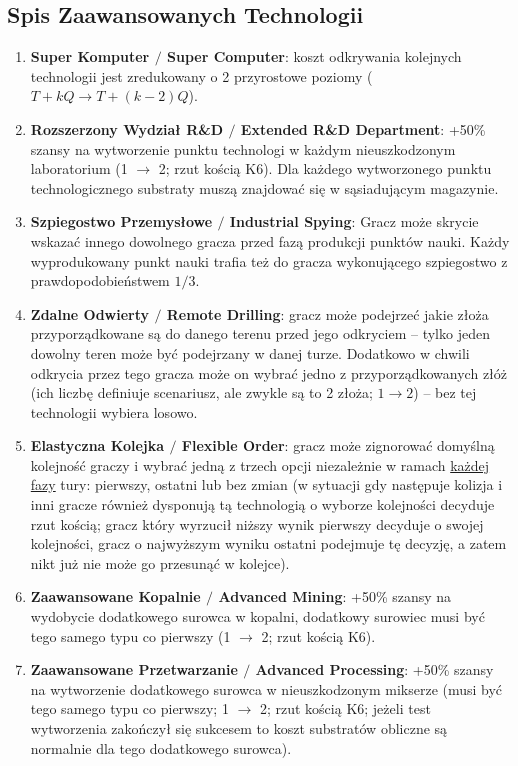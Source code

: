 \documentclass[11pt,a4paper]{article}
\begin{document}
\subsection{Spis Zaawansowanych Technologii}
\begin{enumerate}
\item \textbf{Super Komputer $/$ Super Computer}: koszt odkrywania kolejnych technologii jest zredukowany o 2 przyrostowe poziomy  ($T+kQ \to T+(k-2)Q$).
\item \textbf{Rozszerzony Wydział R\&D $/$ Extended R\&D Department}: +50\% szansy na wytworzenie punktu technologi w każdym nieuszkodzonym laboratorium (1 $\to$ 2; rzut kością K6). Dla każdego wytworzonego punktu technologicznego substraty muszą znajdować się w sąsiadującym magazynie.
\item \textbf{Szpiegostwo Przemysłowe $/$ Industrial Spying}: Gracz może skrycie wskazać innego dowolnego gracza przed fazą produkcji punktów nauki. Każdy wyprodukowany punkt nauki trafia też do gracza wykonującego szpiegostwo z prawdopodobieństwem $1/3$.
\item \textbf{Zdalne Odwierty $/$ Remote Drilling}: gracz może podejrzeć jakie złoża przyporządkowane są do danego terenu przed jego odkryciem -- tylko jeden dowolny teren może być podejrzany w danej turze. Dodatkowo w chwili odkrycia przez tego gracza może on wybrać jedno z przyporządkowanych złóż (ich liczbę definiuje scenariusz, ale zwykle są to 2 złoża; $1 \to 2$) -- bez tej technologii wybiera losowo.
\item \textbf{Elastyczna Kolejka $/$ Flexible Order}: gracz może zignorować domyślną kolejność graczy i wybrać jedną z trzech opcji niezależnie w ramach \underline{każdej fazy} tury: pierwszy, ostatni lub bez zmian (w sytuacji gdy następuje kolizja i inni gracze również dysponują tą technologią o wyborze kolejności decyduje rzut kością; gracz który wyrzucił niższy wynik pierwszy decyduje o swojej kolejności, gracz o najwyższym wyniku ostatni podejmuje tę decyzję, a zatem nikt już nie może go przesunąć w kolejce).
\item \textbf{Zaawansowane Kopalnie $/$ Advanced Mining}: +50\% szansy na wydobycie dodatkowego surowca w kopalni, dodatkowy surowiec musi być tego samego typu co pierwszy (1 $\to$ 2; rzut kością K6).
\item \textbf{Zaawansowane Przetwarzanie $/$ Advanced Processing}: +50\% szansy na wytworzenie dodatkowego surowca w nieuszkodzonym mikserze (musi być tego samego typu co pierwszy; 1 $\to$ 2; rzut kością K6; jeżeli test wytworzenia zakończył się sukcesem to koszt substratów obliczne są normalnie dla tego dodatkowego surowca).

\end{enumerate}
\end{document}
